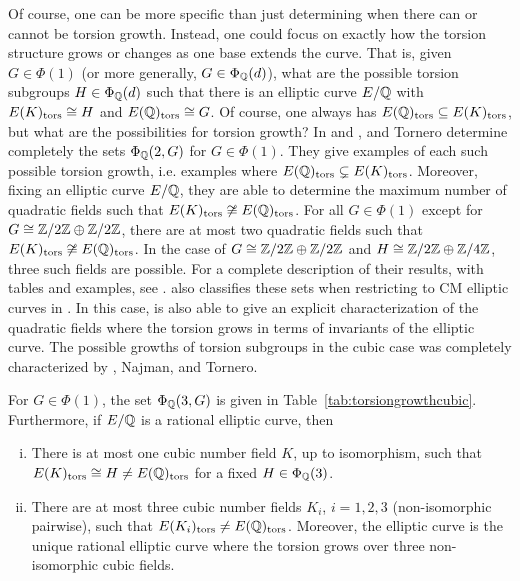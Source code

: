 Of course, one can be more specific than just determining when there can or cannot be torsion growth. Instead, one could focus on exactly how the torsion structure grows or changes as one base extends the curve. That is, given $G \in \Phi(1)$ (or more generally, $G \in \Phi_{\mathbb{Q}}(d)$), what are the possible torsion subgroups $H \in \Phi_{\mathbb{Q}}(d)$ such that there is an elliptic curve $E/\mathbb{Q}$ with $E(K)_{\text{tors}} \cong H$ and $E(\mathbb{Q})_{\text{tors}} \cong G$. Of course, one always has $E(\mathbb{Q})_{\text{tors}} \subseteq E(K)_{\text{tors}}$, but what are the possibilities for torsion growth? In \cite{gonzalezjimeneztornero14} and \cite{gonzalezjimeneztornero16}, \gonjim{} and Tornero determine completely the sets $\Phi_{\mathbb{Q}}(2,G)$ for $G \in \Phi(1)$. They give examples of each such possible torsion growth, i.e. examples where $E(\mathbb{Q})_{\text{tors}} \subsetneq E(K)_{\text{tors}}$. Moreover, fixing an elliptic curve $E/\mathbb{Q}$, they are able to determine the maximum number of quadratic fields such that $E(K)_{\text{tors}} \not\cong E(\mathbb{Q})_{\text{tors}}$. For all $G \in \Phi(1)$ except for $G \cong \mathbb{Z}/2\mathbb{Z} \oplus \mathbb{Z}/2\mathbb{Z}$, there are at most two quadratic fields such that $E(K)_{\text{tors}} \not\cong E(\mathbb{Q})_{\text{tors}}$. In the case of $G \cong \mathbb{Z}/2\mathbb{Z} \oplus \mathbb{Z}/2\mathbb{Z}$ and $H \cong \mathbb{Z}/2\mathbb{Z} \oplus \mathbb{Z}/4\mathbb{Z}$, three such fields are possible. For a complete description of their results, with tables and examples, see \cite{gonzalezjimeneztornero16}. \gonjim{} also classifies these sets when restricting to CM elliptic curves in \cite{gonzalezjimenezgrowth21}. In this case, \gonjim{} is also able to give an explicit characterization of the quadratic fields where the torsion grows in terms of invariants of the elliptic curve. The possible growths of torsion subgroups in the cubic case was completely characterized by \gonjim{}, Najman, and Tornero.


\begin{thm}
For $G \in \Phi(1)$, the set $\Phi_{\mathbb{Q}}(3,G)$ is given in Table~\ref{tab:torsiongrowthcubic}. Furthermore, if $E/\mathbb{Q}$ is a rational elliptic curve, then
	\begin{enumerate}[(i)]
	\item There is at most one cubic number field $K$, up to isomorphism, such that $E(K)_{\text{tors}} \cong H \neq E(\mathbb{Q})_{\text{tors}}$ for a fixed $H \in \Phi_{\mathbb{Q}}(3)$.
	\item There are at most three cubic number fields $K_i$, $i= 1, 2, 3$ (non-isomorphic pairwise), such that $E(K_i)_{\text{tors}} \neq E(\mathbb{Q})_{\text{tors}}$. Moreover, the elliptic curve \ostbt{} is the unique rational elliptic curve where the torsion grows over three non-isomorphic cubic fields. 
	\end{enumerate}
\end{thm}

